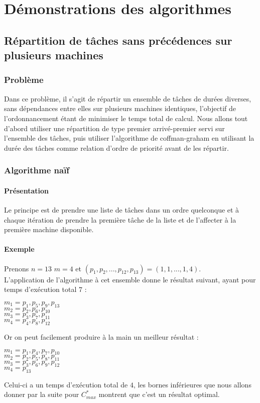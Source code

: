 \chapter{Démonstrations des algorithmes}
\section{Répartition de tâches sans précédences sur plusieurs machines}
\subsection{Problème}
Dans ce problème, il s'agit de répartir un ensemble de tâches de durées 
diverses, sans dépendances entre elles sur plusieurs machines identiques, 
l'objectif de l'ordonnancement étant de minimiser le temps total de calcul.
Nous allons tout d'abord utiliser une répartition de type premier arrivé-premier 
servi sur l'ensemble des tâches, puis utiliser l'algorithme de coffman-graham en 
utilisant la durée des tâches comme relation d'ordre de priorité avant de les 
répartir.

\subsection{Algorithme naïf}
\subsubsection{Présentation}
Le principe est de prendre une liste de tâches dans un ordre quelconque et 
à chaque itération de prendre la première tâche de la liste et de l'affecter 
à la première machine disponible.
\subsubsection{Exemple}
Prenons ${n=13}$ ${m=4}$ et ${(p_{1},p_{2},...,p_{12},p_{13}) 
= (1,1,...,1,4)}$.\\
L'application de l'algorithme à cet ensemble donne le résultat suivant, ayant 
pour temps d'exécution total $7$ :
\begin{center}
$m_{1} = {p_{1},p_{5},p_{9},p_{13}}$ \\
$m_{2} = {p_{2},p_{6},p_{10}}$ \\
$m_{3} = {p_{3},p_{7},p_{11}}$ \\
$m_{4} = {p_{4},p_{8},p_{12}}$ \\
\end{center}
Or on peut facilement produire à la main un meilleur résultat :
\begin{center}
$m_{1} = {p_{1},p_{4},p_{7},p_{10}}$ \\
$m_{2} = {p_{2},p_{5},p_{8},p_{11}}$ \\
$m_{3} = {p_{3},p_{6},p_{9},p_{12}}$ \\
$m_{4} = {p_{13}}$ \\
\end{center}
Celui-ci a un temps d'exécution total de $4$, les bornes inférieures que nous 
allons donner par la suite pour $C^*_{max}$ montrent que c'est un résultat 
optimal.
